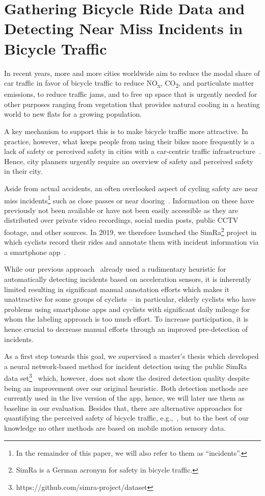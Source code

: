 \chapter{Gathering Bicycle Ride Data and Detecting Near Miss Incidents in Bicycle Traffic}
\label{cha:cyclesense}
In recent years, more and more cities worldwide aim to reduce the modal share of car traffic in favor of bicycle traffic to reduce NO\textsubscript{x}, CO\textsubscript{2}, and particulate matter emissions, to reduce traffic jams, and to free up space that is urgently needed for other purposes ranging from vegetation that provides natural cooling in a heating world to new flats for a growing population.

A key mechanism to support this is to make bicycle traffic more attractive.
In practice, however, what keeps people from using their bikes more frequently is a lack of safety or perceived safety in cities with a car-centric traffic infrastructure~\cite{aldred2018predictors}.
Hence, city planners urgently require an overview of safety and perceived safety in their city.

Aside from actual accidents, an often overlooked aspect of cycling safety are near miss incidents\footnote{In the remainder of this paper, we will also refer to them as ``incidents''.} such as close passes or near dooring~\cite{aldred2018predictors, karakaya2020simra}.
Information on these have previously not been available or have not been easily accessible as they are distributed over private video recordings, social media posts, public CCTV footage, and other sources.
In 2019, we therefore launched the SimRa\footnote{SimRa is a German acronym for safety in bicycle traffic.} project in which cyclists record their rides and annotate them with incident information via a smartphone app~\cite{karakaya2020simra}.

While our previous approach~\cite{karakaya2020simra} already used a rudimentary heuristic for automatically detecting incidents based on acceleration sensors, it is inherently limited resulting in significant manual annotation efforts which makes it unattractive for some groups of cyclists -- in particular, elderly cyclists who have problems using smartphone apps and cyclists with significant daily mileage for whom the labeling approach is too much effort.
To increase participation, it is hence crucial to decrease manual efforts through an improved pre-detection of incidents.

As a first step towards this goal, we supervised a master's thesis which developed a neural network-based method for incident detection using the public SimRa data set\footnote{https://github.com/simra-project/dataset}~\cite{sanchez2020detecting} which, however, does not show the desired detection quality despite being an improvement over our original heuristic.
Both detection methods are currently used in the live version of the app, hence, we will later use them as baseline in our evaluation.
Besides that, there are alternative approaches for quantifying the perceived safety of bicycle traffic, e.g.,~\cite{blanc2016modeling, blanc2017safety, wu2018predicting}, but to the best of our knowledge no other methods are based on mobile motion sensory data.

